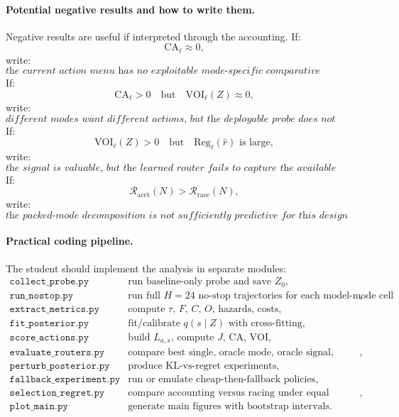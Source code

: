 \documentclass{article}
\begin{document}
\paragraph{Potential negative results and how to write them.}
Negative results are useful if interpreted through the accounting.
If:
\[
    \mathrm{CA}_\ell\approx 0,
\]
write:
\[
    \textit{the current action menu has no exploitable mode-specific comparative advantage;
    use the best single action.}
\]
If:
\[
    \mathrm{CA}_\ell>0
    \quad\text{but}\quad
    \mathrm{VOI}_\ell(Z)\approx 0,
\]
write:
\[
    \textit{different modes want different actions, but the deployable probe does not reveal
    the modes well enough; improve the diagnostic signal.}
\]
If:
\[
    \mathrm{VOI}_\ell(Z)>0
    \quad\text{but}\quad
    \mathrm{Reg}_\ell(\hat r)\text{ is large},
\]
write:
\[
    \textit{the signal is valuable, but the learned router fails to capture the available value;
    improve calibration or the router class.}
\]
If:
\[
    \mathcal R_{\mathrm{acct}}(N)>\mathcal R_{\mathrm{race}}(N),
\]
write:
\[
    \textit{the packed-mode decomposition is not sufficiently predictive for this design menu;
    residuals identify the missing interaction.}
\]

\paragraph{Practical coding pipeline.}
The student should implement the analysis in separate modules:
\[
\begin{array}{ll}
    \texttt{collect\_probe.py} &
    \text{run baseline-only probe and save \(Z_0\)},\\
    \texttt{run\_nostop.py} &
    \text{run full \(H=24\) no-stop trajectories for each model-mode cell},\\
    \texttt{extract\_metrics.py} &
    \text{compute \(\tau\), \(F\), \(C\), \(O\), hazards, costs},\\
    \texttt{fit\_posterior.py} &
    \text{fit/calibrate \(q(s\mid Z)\) with cross-fitting},\\
    \texttt{score\_actions.py} &
    \text{build \(L_{a,s}\), compute \(J\), \(\mathrm{CA}\), \(\mathrm{VOI}\)},\\
    \texttt{evaluate\_routers.py} &
    \text{compare best single, oracle mode, oracle signal, learned, controls},\\
    \texttt{perturb\_posterior.py} &
    \text{produce KL-vs-regret experiments},\\
    \texttt{fallback\_experiment.py} &
    \text{run or emulate cheap-then-fallback policies},\\
    \texttt{selection\_regret.py} &
    \text{compare accounting versus racing under equal evaluation budgets},\\
    \texttt{plot\_main.py} &
    \text{generate main figures with bootstrap intervals}.
\end{array}
\]
\end{document}

